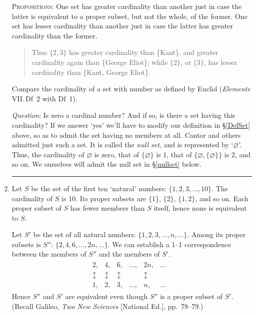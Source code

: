 \documentclass[twoside,openright]{article}
\begin{document}
\begin{enumerate}
  \textsc{Propositions}\label{greatercardinality}: One set has greater
  cardinality than another just in case the latter is equivalent to a
  proper subset, but not the whole, of the former. One set has lesser
  cardinality than another just in case the latter has greater
  cardinality than the former.

  \begin{quote} {\small Thus $\{2,3\}$ has greater cardinality than
      \{Kant\}, and greater cardinality again than \{George Eliot\};
      while $\{2\}$, or $\{3\}$, has lesser cardinality than \{Kant,
      George Eliot\}.  }\end{quote}

  Compare the cardinality of a set with number as defined by Euclid
  (\emph{Elements} VII.\,Df~2 with Df~1).

  \emph{Question}: Is zero a cardinal number? And if so, is there a
  set having this cardinality? If we answer `yes' we'll have to modify
  our definition in \S\ref{DefSet} above, so as to admit the set
  having no members at all. Cantor and others admitted just such a
  set. It is called the \emph{null set}, and is represented by
  `$\varnothing$'. Thus, the cardinality of $\varnothing$ is zero,
  that of $\{\varnothing\}$ is 1, that of
  $\{\varnothing, \{\varnothing\}\}$ is 2, and so on. We ourselves
  will admit the null set in \S\ref{nullset} below.\label{prefnullset}

  \noindent\rule[0.7ex]{\linewidth}{0.5pt}

\item Let $S$ be the set of the first ten `natural' numbers:
  $\{1,2,3,\dotsc,10\}$. The cardinality of $S$ is 10. Its proper
  subsets are $\{1\}$, $\{2\}$, $\{1,2\}$, and so on. Each proper
  subset of $S$ has fewer members than $S$ itself, hence none is
  equivalent to $S$.

  Let $S'$ be the set of all natural numbers:
  $\{1,2,3,\dotsc,n,\dotsc\}$. Among its proper subsets is $S''$:
  $\{2,4,6,\dotsc,2n,\dotsc\}$. We can establish a 1--1 correspondence
  between the members of $S''$ and the members of $S'$.
  \begin{align*}
    \begin{matrix}
      2,&4,&6,&\dotsc,&2n,&\dotsc\\
      \updownarrow\, &\updownarrow\, & \updownarrow\, & & \updownarrow\, & &\\
      1,&2,&3,&\dotsc,&n,&\dotsc
    \end{matrix}
  \end{align*}
  Hence $S''$ and $S'$ are equivalent even though $S''$ is a proper
  subset of $S'$. (Recall Galileo, \emph{Two New Sciences} [National
  Ed.], pp.~78--79.)


\end{enumerate}
\end{document}
